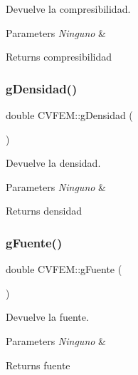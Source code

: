 Devuelve la compresibilidad. 


\begin{DoxyParams}{Parameters}
{\em Ninguno} & \\
\hline
\end{DoxyParams}
\begin{DoxyReturn}{Returns}
compresibilidad 
\end{DoxyReturn}
\hypertarget{class_c_v_f_e_m_a7b896f4031aad73d3f6369b8eeb1fb2e}{}\label{class_c_v_f_e_m_a7b896f4031aad73d3f6369b8eeb1fb2e} 
\subsubsection{\texorpdfstring{g\+Densidad()}{gDensidad()}}
{\footnotesize\ttfamily double C\+V\+F\+E\+M\+::g\+Densidad (\begin{DoxyParamCaption}{ }\end{DoxyParamCaption})\hspace{0.3cm}{\ttfamily [inline]}}



Devuelve la densidad. 


\begin{DoxyParams}{Parameters}
{\em Ninguno} & \\
\hline
\end{DoxyParams}
\begin{DoxyReturn}{Returns}
densidad 
\end{DoxyReturn}
\hypertarget{class_c_v_f_e_m_a5b763bad3cf2dd5d62b9c54d6d98dac6}{}\label{class_c_v_f_e_m_a5b763bad3cf2dd5d62b9c54d6d98dac6} 
\subsubsection{\texorpdfstring{g\+Fuente()}{gFuente()}}
{\footnotesize\ttfamily double C\+V\+F\+E\+M\+::g\+Fuente (\begin{DoxyParamCaption}{ }\end{DoxyParamCaption})\hspace{0.3cm}{\ttfamily [inline]}}



Devuelve la fuente. 


\begin{DoxyParams}{Parameters}
{\em Ninguno} & \\
\hline
\end{DoxyParams}
\begin{DoxyReturn}{Returns}
fuente 
\end{DoxyReturn}
\hypertarget{class_c_v_f_e_m_a83309ce392473cd4d5bb2e1290aac2cf}{}\label{class_c_v_f_e_m_a83309ce392473cd4d5bb2e1290aac2cf} 
